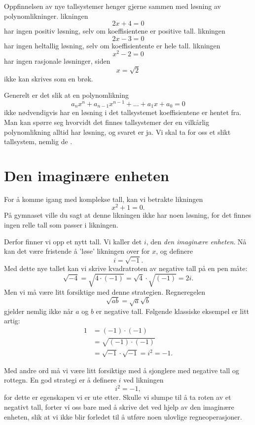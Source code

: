 

\label{ch:komplekse-tall}

Oppfinnelsen av nye tallsystemer henger gjerne sammen med løsning av polynomlikninger. likningen 
\[
2x+4=0
\]
har ingen positiv løsning, selv om koeffisientene er positive tall. 
likningen
\[
2x-3=0
\]
har ingen heltallig løsning, selv om koeffisientente er hele tall.
likningen
\[
x^2-2=0
\]
har ingen rasjonale løsninger, siden
\[
x=\sqrt{2}
\]
ikke kan skrives som en brøk. 

Generelt er det slik at en polynomlikning
\[
a_nx^n+a_{n-1}x^{n-1}+...+a_1x+a_0=0
\]
ikke nødvendigvis har en løsning i det tallsystemet koeffisientene er hentet fra. 
Man kan spørre seg hvorvidt det finnes tallsystemer der en vilkårlig polynomlikning alltid har løsning, 
og svaret er ja. 
Vi skal ta for oss et slikt tallsystem, nemlig de .


\section*{Den imaginære enheten}
For å komme igang med komplekse tall, kan vi betrakte likningen
\[
x^2+1=0.
\]
På gymnaset ville du sagt at denne likningen ikke har noen løsning, for det finnes ingen relle tall som passer i likningen. 

Derfor finner vi opp et nytt tall. Vi kaller det $i$, den \emph{den imaginære enheten}. 
Nå kan det være fristende å 'løse' likningen over for $x$, og definere
\[
i=\sqrt{-1}.
\]
Med dette nye tallet kan vi skrive kvadratroten av negative tall på en pen måte:
\begin{equation*}
\sqrt{-4}=\sqrt{4\cdot (-1)}=\sqrt{4}\cdot \sqrt{(-1)}=2i.
\end{equation*}
Men vi må være litt forsiktige med denne strategien. 
Regneregelen
\[
\sqrt{ab}=\sqrt{a}\sqrt{b}
\]
gjelder nemlig ikke når $a$ og $b$ er negative tall.
Følgende klassiske eksempel er litt artig:
\begin{align*}
1&=(-1)\cdot(-1)\\&=\sqrt{(-1)\cdot (-1)}\\&=\sqrt{-1}\cdot \sqrt{ -1}=i^2=-1.
\end{align*}

Med andre ord må vi være litt forsiktige med å sjonglere med negative tall og rottegn.
En god strategi er å definere $i$ ved likningen
\[
i^2=-1,
\]
for dette er egenskapen vi er ute etter. 
Skulle vi slumpe til å ta roten av et negativt tall, 
forter vi oss bare med å skrive det ved hjelp av den imaginære enheten, 
slik at vi ikke blir forledet til å utføre noen ulovlige regneoperasjoner.

